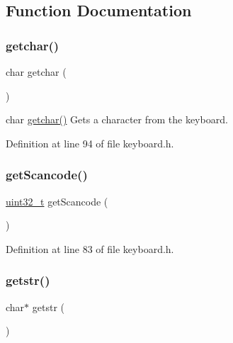 \subsection{Function Documentation}
\mbox{\label{a00023_a0979671914792955a7a68461634ff82d_a0979671914792955a7a68461634ff82d}} 
\subsubsection{\texorpdfstring{getchar()}{getchar()}}
{\footnotesize\ttfamily char getchar (\begin{DoxyParamCaption}{ }\end{DoxyParamCaption})}



char \hyperlink{a00023_a0979671914792955a7a68461634ff82d_a0979671914792955a7a68461634ff82d}{getchar()} Gets a character from the keyboard. 



Definition at line 94 of file keyboard.\+h.

\mbox{\label{a00023_ab584031dc93be7f7bda67c862a770fca_ab584031dc93be7f7bda67c862a770fca}} 
\subsubsection{\texorpdfstring{get\+Scancode()}{getScancode()}}
{\footnotesize\ttfamily \hyperlink{a00038_a435d1572bf3f880d55459d9805097f62_a435d1572bf3f880d55459d9805097f62}{uint32\+\_\+t} get\+Scancode (\begin{DoxyParamCaption}{ }\end{DoxyParamCaption})}



Definition at line 83 of file keyboard.\+h.

\mbox{\label{a00023_af63ede2ad39481e059d92df0513f279a_af63ede2ad39481e059d92df0513f279a}} 
\subsubsection{\texorpdfstring{getstr()}{getstr()}}
{\footnotesize\ttfamily char$\ast$ getstr (\begin{DoxyParamCaption}{ }\end{DoxyParamCaption})}



